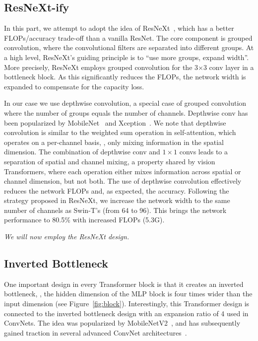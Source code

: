 \subsection{ResNeXt-ify}
In this part, we attempt to adopt the idea of ResNeXt~\cite{Xie2017}, which has a better FLOPs/accuracy trade-off than a vanilla ResNet. The core component is grouped convolution, where the convolutional filters are separated into different groups. At a high level, ResNeXt's guiding principle is to ``use more groups, expand width''. More precisely, ResNeXt employs grouped convolution for the 3$\times$3 conv layer in a bottleneck block. As this significantly reduces the FLOPs, the network width is expanded to compensate for the capacity loss. 

In our case we use depthwise convolution, a special case of grouped convolution where the number of groups equals the number of channels. Depthwise conv has been popularized by MobileNet~\cite{Howard2017} and Xception~\cite{Chollet2017}. We note that depthwise convolution is similar to the weighted sum operation in self-attention, which operates on a per-channel basis, \ie, only mixing information in the spatial dimension. The combination of depthwise conv and $1\times1$ convs leads to a separation of spatial and channel mixing, a property shared by vision Transformers, where each operation either mixes information across spatial or channel dimension, but not both. The use of depthwise convolution effectively reduces the network FLOPs and, as expected, the accuracy. Following the strategy proposed in ResNeXt, we increase the network width to the same number of channels as Swin-T's (from 64 to 96). This brings the network performance to 80.5\% with increased FLOPs (5.3G).
  
\textit{We will now employ the ResNeXt design.}

\subsection{Inverted Bottleneck}
One important design in every Transformer block is that it creates an inverted bottleneck, \ie, the hidden dimension of the MLP block is four times wider than the input dimension (see Figure~\ref{fig:block}). Interestingly, this Transformer design is connected to the inverted bottleneck design with an expansion ratio of 4 used in ConvNets. The idea was popularized by MobileNetV2~\cite{Sandler2018}, and has subsequently gained traction in several advanced ConvNet architectures~\cite{Tan2019efficientnet,tan2019mnasnet}.

